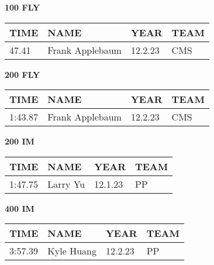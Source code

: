 \begin{table}[H]
\centering
\begin{minipage}[t]{0.48\textwidth}
\centering
\textbf{100 FLY}\\[0.1cm]
\begin{tabular}{@{}p{1.8cm}p{2.8cm}p{1.2cm}p{1.4cm}@{}}
\hline
    \textbf{TIME} & \textbf{NAME} & \textbf{YEAR} & \textbf{TEAM} \\
\hline
    47.41 & Frank Applebaum & 12.2.23 & CMS \\
\hline
\end{tabular}
\end{minipage}\hfill
\begin{minipage}[t]{0.48\textwidth}
\centering
\textbf{200 FLY}\\[0.1cm]
\begin{tabular}{@{}p{1.8cm}p{2.8cm}p{1.2cm}p{1.4cm}@{}}
\hline
    \textbf{TIME} & \textbf{NAME} & \textbf{YEAR} & \textbf{TEAM} \\
\hline
    1:43.87 & Frank Applebaum & 12.2.23 & CMS \\
\hline
\end{tabular}
\end{minipage}
\end{table}

\begin{table}[H]
\centering
\begin{minipage}[t]{0.48\textwidth}
\centering
\textbf{200 IM}\\[0.1cm]
\begin{tabular}{@{}p{1.8cm}p{2.8cm}p{1.2cm}p{1.4cm}@{}}
\hline
    \textbf{TIME} & \textbf{NAME} & \textbf{YEAR} & \textbf{TEAM} \\
\hline
    1:47.75 & Larry Yu & 12.1.23 & PP \\
\hline
\end{tabular}
\end{minipage}\hfill
\begin{minipage}[t]{0.48\textwidth}
\centering
\textbf{400 IM}\\[0.1cm]
\begin{tabular}{@{}p{1.8cm}p{2.8cm}p{1.2cm}p{1.4cm}@{}}
\hline
    \textbf{TIME} & \textbf{NAME} & \textbf{YEAR} & \textbf{TEAM} \\
\hline
    3:57.39 & Kyle Huang & 12.2.23 & PP \\
\hline
\end{tabular}
\end{minipage}
\end{table}

